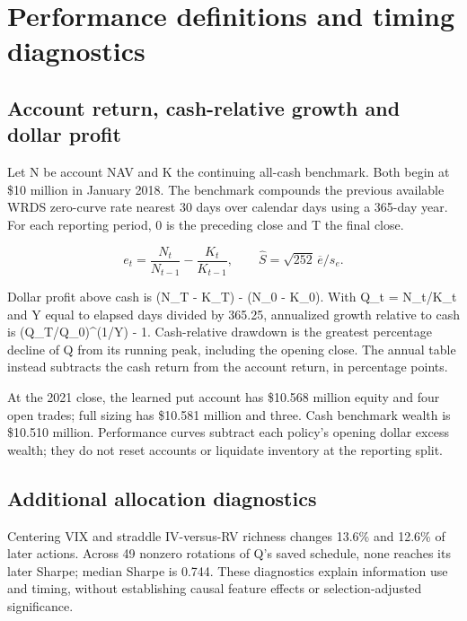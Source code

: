\clearpage

\section{Performance definitions and timing diagnostics}\label{app:e}

\subsection*{Account return, cash-relative growth and dollar profit}

Let N be account NAV and K the continuing all-cash benchmark. Both begin at \$10 million in January 2018. The benchmark compounds the previous available WRDS zero-curve rate nearest 30 days over calendar days using a 365-day year. For each reporting period, 0 is the preceding close and T the final close.


\begin{equation*}e_t=\frac{N_t}{N_{t-1}}-\frac{K_t}{K_{t-1}},\qquad\widehat S=\sqrt{252}\,\overline{e}/s_e.\end{equation*}

Dollar profit above cash is (N\_T - K\_T) - (N\_0 - K\_0). With Q\_t = N\_t/K\_t and Y equal to elapsed days divided by 365.25, annualized growth relative to cash is (Q\_T/Q\_0)\textasciicircum{}(1/Y) - 1. Cash-relative drawdown is the greatest percentage decline of Q from its running peak, including the opening close. The annual table instead subtracts the cash return from the account return, in percentage points.


At the 2021 close, the learned put account has \$10.568 million equity and four open trades; full sizing has \$10.581 million and three. Cash benchmark wealth is \$10.510 million. Performance curves subtract each policy's opening dollar excess wealth; they do not reset accounts or liquidate inventory at the reporting split.


\subsection*{Additional allocation diagnostics}

Centering VIX and straddle IV-versus-RV richness changes 13.6\% and 12.6\% of later actions. Across 49 nonzero rotations of Q's saved schedule, none reaches its later Sharpe; median Sharpe is 0.744. These diagnostics explain information use and timing, without establishing causal feature effects or selection-adjusted significance.


